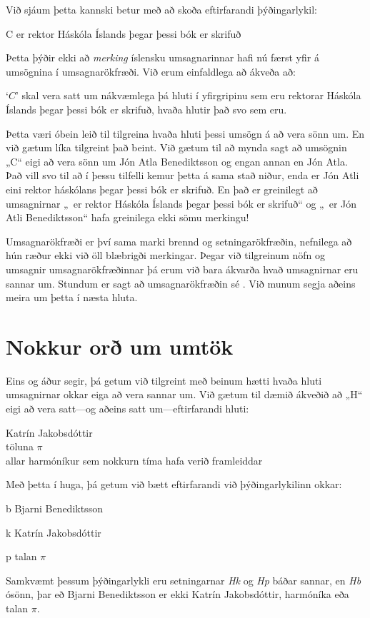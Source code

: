 Við sjáum þetta kannski betur með að skoða eftirfarandi þýðingarlykil:
	\begin{ekey}
		\item[C]  er rektor Háskóla Íslands þegar þessi bók er skrifuð
	\end{ekey} 
Þetta þýðir ekki að \emph{merking} íslensku umsagnarinnar hafi nú færst yfir á umsögnina í umsagnarökfræði. Við erum einfaldlega að ákveða að:
	\begin{ebullet}
		\item `$C$' skal vera satt um nákvæmlega þá hluti í yfirgripinu sem eru rektorar Háskóla Íslands þegar þessi bók er skrifuð, hvaða hlutir það svo sem eru.
	\end{ebullet}
Þetta væri óbein leið til tilgreina hvaða hluti þessi umsögn á að vera sönn um. En við gætum líka tilgreint það beint. Við gætum til að mynda sagt að umsögnin „C“ eigi að vera sönn um Jón Atla Benediktsson og engan annan en Jón Atla. Það vill svo til að í þessu tilfelli kemur þetta á sama stað niður, enda er Jón Atli eini rektor háskólans þegar þessi bók er skrifuð. En það er greinilegt að umsagnirnar „\blank\ er rektor Háskóla Íslands þegar þessi bók er skrifuð“ og „\blank\ er Jón Atli Benediktsson“ hafa greinilega ekki sömu merkingu!
	
Umsagnarökfræði er því sama marki brennd og setningarökfræðin, nefnilega að hún ræður ekki við öll blæbrigði merkingar. Þegar við tilgreinum nöfn og umsagnir umsagnarökfræðinnar þá erum við bara ákvarða hvað umsagnirnar eru sannar um. Stundum er sagt að umsagnarökfræðin sé . Við munum segja aðeins meira um þetta í næsta hluta.

\section{Nokkur orð um umtök}

Eins og áður segir, þá getum við tilgreint með beinum hætti hvaða hluti umsagnirnar okkar eiga að vera sannar um. Við gætum til dæmið ákveðið að „H“ eigi að vera satt---og aðeins satt um---eftirfarandi hluti:
	\begin{center}
		Katrín Jakobsdóttir\\
		töluna $\pi$\\
		allar harmóníkur sem nokkurn tíma hafa verið framleiddar
	\end{center}
Með þetta í huga, þá getum við bætt eftirfarandi við þýðingarlykilinn okkar:	
	\begin{ekey}
		\item[b] Bjarni Benediktsson
		\item[k] Katrín Jakobsdóttir
		\item[p] talan $\pi$
	\end{ekey}
Samkvæmt þessum þýðingarlykli eru setningarnar \emph{Hk} og \emph{Hp} báðar sannar, en \emph{Hb} ósönn, þar eð Bjarni Benediktsson er ekki Katrín Jakobsdóttir, harmóníka eða talan $\pi$. 
	

